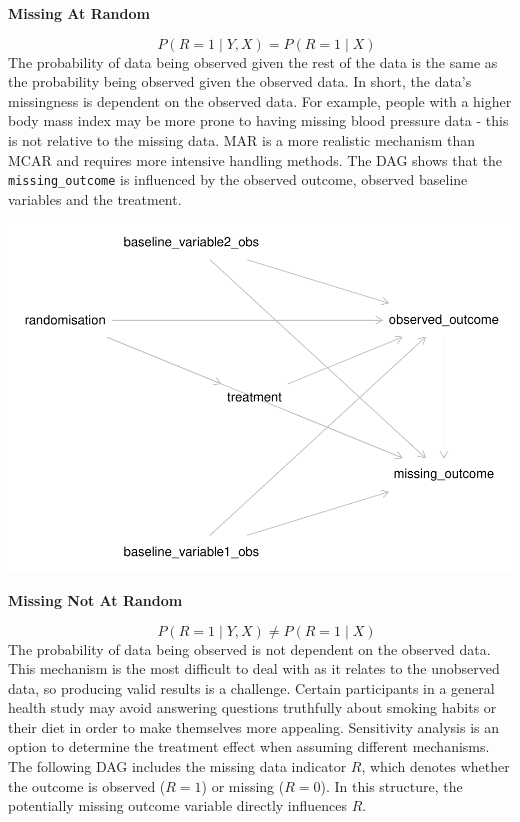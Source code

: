 \documentclass{article}
\newcommand{\pandocbounded}[1]{#1}
\begin{document}
\textbf{Missing At Random}

\[\quad P(R = 1 \mid Y, X) = P(R = 1 \mid X)\] The probability of data
being observed given the rest of the data is the same as the probability
being observed given the observed data. In short, the data's missingness
is dependent on the observed data. For example, people with a higher
body mass index may be more prone to having missing blood pressure data
- this is not relative to the missing data. MAR is a more realistic
mechanism than MCAR and requires more intensive handling methods. The
DAG shows that the \texttt{missing\_outcome} is influenced by the
observed outcome, observed baseline variables and the treatment.

\pandocbounded{\includegraphics[keepaspectratio]{Final_Report_files/figure-latex/unnamed-chunk-2-1.pdf}}

\textbf{Missing Not At Random}

\[\quad P(R = 1 \mid Y, X) \ne P(R = 1 \mid X)\] The probability of data
being observed is not dependent on the observed data. This mechanism is
the most difficult to deal with as it relates to the unobserved data, so
producing valid results is a challenge. Certain participants in a
general health study may avoid answering questions truthfully about
smoking habits or their diet in order to make themselves more appealing.
Sensitivity analysis is an option to determine the treatment effect when
assuming different mechanisms. The following DAG includes the missing
data indicator \(R\), which denotes whether the outcome is observed
(\(R = 1\)) or missing (\(R = 0\)). In this structure, the potentially
missing outcome variable directly influences \(R\).
\end{document}
